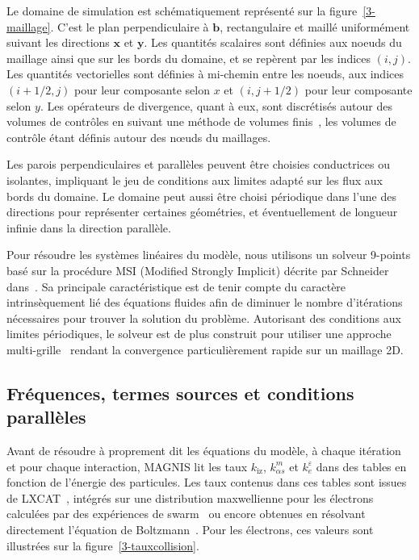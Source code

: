 \begin{refsection}
Le domaine de simulation est schématiquement représenté sur la figure~\ref{3-maillage}.
C'est le plan perpendiculaire à $\mathbf{b}$, rectangulaire et maillé uniformément suivant
les directions $\mathbf{x}$ et $\mathbf{y}$. Les quantités
scalaires sont définies aux noeuds du maillage ainsi que sur les bords du
domaine, et se repèrent par les indices $(i,j)$. Les quantités vectorielles
sont définies à mi-chemin entre les noeuds, aux indices $(i+1/2,j)$ pour leur
composante selon $x$ et $(i,j+1/2)$ pour leur composante selon $y$.
Les opérateurs
de divergence, quant à eux, sont discrétisés autour des volumes de contrôles en
suivant une méthode de volumes finis~\parencite{toro}, les volumes de
contrôle étant définis autour des n\oe uds du maillages. 

Les parois perpendiculaires et parallèles peuvent être choisies conductrices ou
isolantes, impliquant le jeu de conditions aux limites adapté sur les flux
aux bords du domaine. Le domaine peut aussi être choisi périodique dans l'une
des directions pour représenter certaines géométries, et éventuellement
de longueur infinie dans la direction parallèle.
 
Pour résoudre les systèmes linéaires du modèle, nous utilisons un solveur
9-points basé sur la procédure
MSI (Modified Strongly Implicit) décrite par Schneider
dans~\parencite{Schneider}. Sa principale caractéristique est de tenir
compte du caractère intrinsèquement lié des équations fluides afin de diminuer
le nombre d'itérations nécessaires pour trouver la solution du problème. Autorisant des
conditions aux limites périodiques, le solveur est de plus construit pour
utiliser une approche multi-grille~\parencite{Fedorenko} rendant la convergence
particulièrement rapide sur un maillage 2D.

\subsection{Fréquences, termes sources et conditions parallèles}
Avant de résoudre à proprement dit les équations du modèle, à chaque
itération et pour chaque interaction, MAGNIS lit les taux $k_\text{iz}$,
$k^m_{\alpha s}$ et $k^\varepsilon_{e}$ dans des tables en fonction
de l'énergie des particules. 
Les taux contenus dans ces tables
sont issues de LXCAT~\parencite{LXCAT}, intégrés sur une distribution
maxwellienne pour les électrons calculées par des expériences de
swarm~\parencite{Ellis} ou encore obtenues en résolvant directement l'équation
de Boltzmann~\parencite{Bolsig}. Pour les électrons, ces valeurs sont
illustrées sur la figure~\ref{3-tauxcollision}.


\end{refsection}
